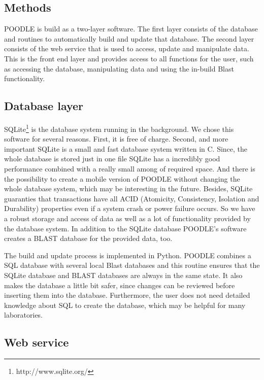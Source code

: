 \documentclass{bioinfo}
\begin{document}
\begin{methods}
\section{Methods}

POODLE is build as a two-layer software. The first layer consists of the database and routines to 
automatically build and update that database. The second layer consists of the web service that is 
used to access, update and manipulate data. This is the front end layer and provides access to all 
functions for the user, such as accessing the database, manipulating data and using the in-build 
Blast functionality.

\subsection{Database layer}

SQLite\footnote{http://www.sqlite.org/} is the database system running in the background. We chose 
this software for several reasons. First, it is free of charge. Second, and more important SQLite is 
a small and fast database system written in C. Since, the whole database is stored just in one file
SQLite has a incredibly good performance combined with a really small among of required space. And there 
is the possibility to create a mobile version of POODLE without changing the whole database system, 
which may be interesting in the future. Besides, 
SQLite guaranties that transactions have all ACID (Atomicity, Consistency, Isolation and Durability) properties even if a system crash or power failure occurs. So 
we have a robust storage and access of data as well as a lot of functionality provided by the database 
system. In addition to the SQLite database POODLE's software creates a BLAST database for the provided 
data, too. 

The build and update process is implemented in Python. POODLE combines a SQL database with several 
local Blast databases and this routine 
ensures that the SQLite database and BLAST databases are always in the same state. 
It also makes the database a little bit safer, since changes can be reviewed before inserting them 
into the database. Furthermore, the user does not need detailed knowledge about SQL to create the 
database, which may be helpful for many laboratories.

\subsection{Web service}


\end{methods}
\end{document}
